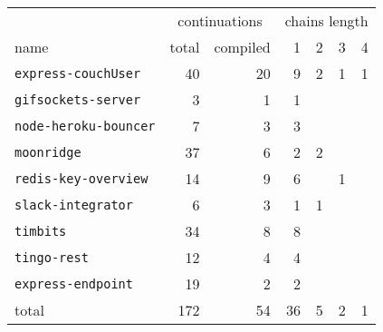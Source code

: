 \begin{tabular}{l r r r r r r }
                                      & \multicolumn{2}{c}{continuations}      & \multicolumn{4}{c}{chains length}\\
name                                  & total              & compiled          & 1  & 2 & 3 & 4 \\
\hline
\texttt{express-couchUser}            & 40                 & 20                & 9  & 2 & 1 & 1 \\
\texttt{gifsockets-server}            & 3                  & 1                 & 1  &           \\ 
\texttt{node-heroku-bouncer}          & 7                  & 3                 & 3  &           \\
\texttt{moonridge}                    & 37                 & 6                 & 2  & 2         \\
\texttt{redis-key-overview}           & 14                 & 9                 & 6  &   & 1     \\
\texttt{slack-integrator}             & 6                  & 3                 & 1  & 1         \\
\texttt{timbits}                      & 34                 & 8                 & 8              \\
\texttt{tingo-rest}                   & 12                 & 4                 & 4              \\
\texttt{express-endpoint}             & 19                 & 2                 & 2              \\
\hline
total                                 & 172                & 54                & 36 & 5 & 2 & 1 \\
\end{tabular}









